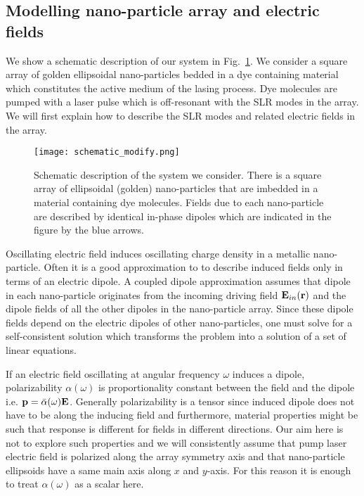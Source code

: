 \documentclass{iopart}
\begin{document}
\subsection{Modelling nano-particle array and electric fields}
We show a schematic description of our system in Fig.~\ref{fig:schematic}.  We consider a square array
of golden ellipsoidal nano-particles bedded in a dye containing material
which constitutes the active medium of the lasing process. Dye molecules are
pumped with a laser pulse which is off-resonant with the SLR modes in the array. We will first explain how to describe the SLR modes and related
electric fields in the array.

\begin{figure} %
\texttt{[image: schematic\_modify.png]}
\caption[Fig1]{Schematic description of the system we consider. There is a square array of
ellipsoidal (golden) nano-particles that are imbedded in a material containing dye molecules. Fields due to each nano-particle are
described by identical in-phase dipoles which are indicated in the figure by the blue arrows.
}
\label{fig:schematic}
\end{figure} 

Oscillating electric field induces oscillating charge density in a metallic nano-particle. Often it is a good approximation to to describe induced fields
only in terms of an electric dipole. A coupled dipole approximation 
assumes that dipole in each nano-particle originates from the incoming driving field ${\bf E}_{in}({\bf r})$ and the dipole fields of all the other dipoles in the nano-particle array. Since these dipole fields depend on the electric dipoles
of other nano-particles, one must solve for a self-consistent solution
which transforms the problem into a solution of a set of linear equations.

If an electric field oscillating at angular frequency $\omega$ induces a dipole, polarizability $\alpha(\omega)$ is proportionality
constant between the field and the dipole  i.e. ${\bf p}=\bar{\alpha}(\omega) {\bf E}$.
Generally polarizability is a tensor since induced dipole does not have to be along the
inducing field and furthermore, material properties might be such that response is different
for fields in different directions. Our aim here is not to explore such properties and we will consistently assume that pump laser electric field is polarized along the array symmetry axis and that nano-particle ellipsoids
have a same main axis along $x$ and $y$-axis. For this reason it is enough
to treat $\alpha(\omega)$ as a scalar here.
\end{document}
